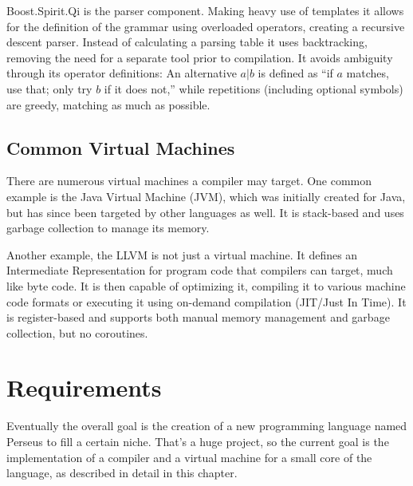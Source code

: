 		Boost.Spirit.Qi is the parser component. Making heavy use of templates it allows for the definition of the grammar using overloaded operators, creating a recursive descent parser. Instead of calculating a parsing table it uses backtracking, removing the need for a separate tool prior to compilation. It avoids ambiguity through its operator definitions: An alternative $a|b$ is defined as ``if $a$ matches, use that; only try $b$ if it does not,'' while repetitions (including optional symbols) are greedy, matching as much as possible.

	\section{Common Virtual Machines}
		
		There are numerous virtual machines a compiler may target. One common example is the Java Virtual Machine (JVM), which was initially created for Java, but has since been targeted by other languages as well. It is stack-based and uses garbage collection to manage its memory.
		
		Another example, the LLVM is not just a virtual machine. It defines an Intermediate Representation for program code that compilers can target, much like byte code. It is then capable of optimizing it, compiling it to various machine code formats or executing it using on-demand compilation (JIT/Just In Time). It is register-based and supports both manual memory management and garbage collection, but no coroutines.

\chapter{Requirements}\label{requirements}

	
	Eventually the overall goal is the creation of a new programming language named Perseus to fill a certain niche. That's a huge project, so the current goal is the implementation of a compiler and a virtual machine for a small core of the language, as described in detail in this chapter.

